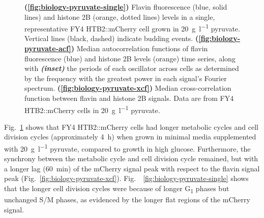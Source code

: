 \begin{figure}
  \caption[
    Flavin fluorescence and histone 2B levels in a single, representative FY4 HTB2::mCherry cell grown in \SI{20}{\gram~\litre^{-1}} pyruvate.
    Median autocorrelation functions of flavin fluorescence and histone 2B levels time series, along with the periods of each oscillator across cells.
    Median cross-correlation function between flavin and histone 2B signals.
    Data are from FY4 HTB2::mCherry cells in \SI{20}{\gram~\litre^{-1}} pyruvate.
  ]{
    \textbf{(\ref{fig:biology-pyruvate-single})}
    Flavin fluorescence (blue, solid lines) and histone 2B (orange, dotted lines) levels in a single, representative FY4 HTB2::mCherry cell grown in \SI{20}{\gram~\litre^{-1}} pyruvate.
    Vertical lines (black, dashed) indicate budding events.
    \textbf{(\ref{fig:biology-pyruvate-acf})}
    Median autocorrelation functions of flavin fluorescence (blue) and histone 2B levels (orange) time series, along with \textit{\textbf{(inset)}} the periods of each oscillator across cells as determined by the frequency with the greatest power in each signal's Fourier spectrum.
    \textbf{(\ref{fig:biology-pyruvate-xcf})}
    Median cross-correlation function between flavin and histone 2B signals.
    Data are from FY4 HTB2::mCherry cells in \SI{20}{\gram~\litre^{-1}} pyruvate.
  }
  \label{fig:biology-pyruvate}
\end{figure}

Fig.\ \ref{fig:biology-pyruvate} shows that FY4 HTB2::mCherry cells had longer metabolic cycles and cell division cycles (approximately \SI{4}{\hour}) when grown in minimal media supplemented with \SI{20}{\gram~\litre^{-1}} pyruvate, compared to growth in high glucose.
Furthermore, the synchrony between the metabolic cycle and cell division cycle remained, but with a longer lag (\SI{60}{\minute}) of the mCherry signal peak with respect to the flavin signal peak (Fig.\ \ref{fig:biology-pyruvate-xcf}).
Fig.\ ~\ref{fig:biology-pyruvate-single} shows that the longer cell division cycles were because of longer G\textsubscript{1} phases but unchanged S/M phases, as evidenced by the longer flat regions of the mCherry signal.



